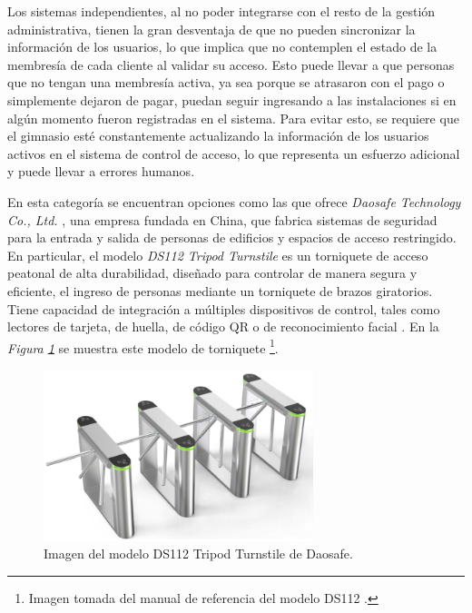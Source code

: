 Los sistemas independientes, al no poder integrarse con el resto de la gestión administrativa, tienen la gran desventaja de que no pueden sincronizar la información de los usuarios, lo que implica que no contemplen el estado de la membresía de cada cliente al validar su acceso. Esto puede llevar a que personas que no tengan una membresía activa, ya sea porque se atrasaron con el pago o simplemente dejaron de pagar, puedan seguir ingresando a las instalaciones si en algún momento fueron registradas en el sistema. Para evitar esto, se requiere que el gimnasio esté constantemente actualizando la información de los usuarios activos en el sistema de control de acceso, lo que representa un esfuerzo adicional y puede llevar a errores humanos.

En esta categoría se encuentran opciones como las que ofrece \textit{Daosafe Technology Co., Ltd.} \cite{daosafe}, una empresa fundada en China, que fabrica sistemas de seguridad para la entrada y salida de personas de edificios y espacios de acceso restringido. En particular, el modelo \textit{DS112 Tripod Turnstile} es un torniquete de acceso peatonal de alta durabilidad, diseñado para controlar de manera segura y eficiente, el ingreso de personas mediante un torniquete de brazos giratorios. Tiene capacidad de integración a múltiples dispositivos de control, tales como lectores de tarjeta, de huella, de código QR o de reconocimiento facial \cite{daosafe_ds112}. En la \textit{Figura \ref{fig:daosafe_turnstile}} se muestra este modelo de torniquete \footnote{Imagen tomada del manual de referencia del modelo DS112 \cite{daosafe_ds112}.}.

\begin{figure}[h!]
    \centering
    \includegraphics[width=0.7\textwidth]{fig/daosafe_turnstile.png}
    \caption{Imagen del modelo DS112 Tripod Turnstile de Daosafe.}
    \label{fig:daosafe_turnstile}
\end{figure}



